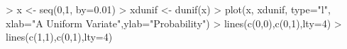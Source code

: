 \begin{Schunk}
\begin{Sinput}
> x <- seq(0,1, by=0.01)
> xdunif <- dunif(x)
> plot(x, xdunif, type="l", xlab="A Uniform Variate",ylab="Probability")
> lines(c(0,0),c(0,1),lty=4)
> lines(c(1,1),c(0,1),lty=4)
\end{Sinput}
\end{Schunk}
